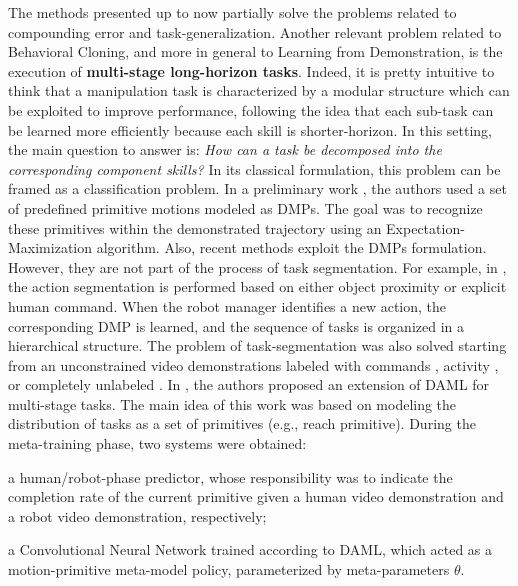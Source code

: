 \newline The methods presented up to now partially solve the problems related to compounding error and task-generalization. Another relevant problem related to Behavioral Cloning, and more in general to Learning from Demonstration, is the execution of \textbf{multi-stage long-horizon tasks}. Indeed, it is pretty intuitive to think that a manipulation task is characterized by a modular structure which can be exploited to improve performance, following the idea that each sub-task can be learned more efficiently because each skill is shorter-horizon. In this setting, the main question to answer is: \textit{How can a task be decomposed into the corresponding component skills?} In its classical formulation, this problem can be framed as a classification problem. In a preliminary work \cite{meier2011movement_primitive}, the authors used a set of predefined primitive motions modeled as DMPs. The goal was to recognize these primitives within the demonstrated trajectory using an Expectation-Maximization algorithm. Also, recent methods \cite{caccavale2019kinesthetic,agostini2020manipulation} exploit the DMPs formulation. However, they are not part of the process of task segmentation. For example, in \cite{caccavale2019kinesthetic}, the action segmentation is performed based on either object proximity or explicit human command. When the robot manager identifies a new action, the corresponding DMP is learned, and the sequence of tasks is organized in a hierarchical structure. The problem of task-segmentation was also solved starting from an unconstrained video demonstrations labeled with commands \cite{xu2018neural_task_programming}, activity \cite{yang2015robot}, or completely unlabeled \cite{yu2018one_shot_hil,Mandlekar2020GTI}. In \cite{yu2018one_shot_hil}, the authors proposed an extension of DAML for multi-stage tasks. The main idea of this work was based on modeling the distribution of tasks as a set of primitives (e.g., reach primitive). During the meta-training phase, two systems were obtained: \begin{enumerate*}[label=(\textbf{\arabic*})]
    \item a human/robot-phase predictor, whose responsibility was to indicate the completion rate of the current primitive given a human video demonstration and a robot video demonstration, respectively;
    \item a Convolutional Neural Network trained according to DAML, which acted as a motion-primitive meta-model policy, parameterized by meta-parameters $\theta$.

\end{enumerate*}
